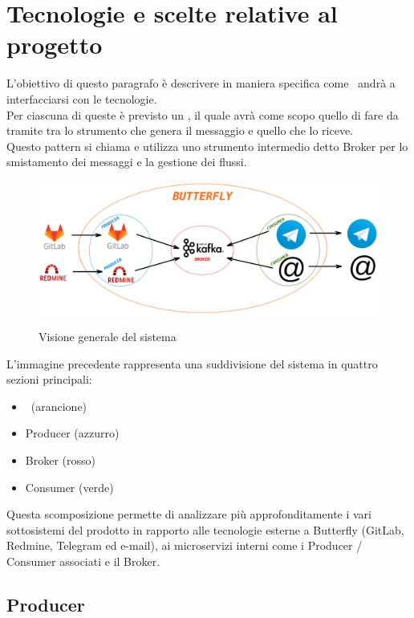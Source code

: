\section{Tecnologie e scelte relative al progetto}
	L'obiettivo di questo paragrafo è descrivere in maniera specifica come \progetto\ andrà a interfacciarsi con le tecnologie.\\
	Per ciascuna di queste è previsto un , il quale avrà come scopo quello di fare da tramite tra lo strumento che genera il messaggio e quello che lo riceve.\\
	Questo pattern si chiama  e utilizza uno strumento intermedio detto Broker per lo smistamento dei messaggi e la gestione dei flussi.

	\begin{figure}[H]
		\centering
		\includegraphics[width=\textwidth]{img/butterfly.png}\\
		\caption{Visione generale del sistema \progetto}
		\label{fig:butterfly}
	\end{figure}
	L'immagine precedente rappresenta una suddivisione del sistema in quattro sezioni principali:
	\begin{itemize}
		\item \progetto\ (arancione)
		\item Producer (azzurro)
		\item Broker (rosso)
		\item Consumer (verde)
	\end{itemize}
	Questa scomposizione permette di analizzare più approfonditamente i vari sottosistemi del prodotto in rapporto alle tecnologie esterne a Butterfly (GitLab, Redmine, Telegram ed e-mail), ai microservizi interni come i Producer / Consumer associati e il Broker.
	
	\subsection{Producer}
	
